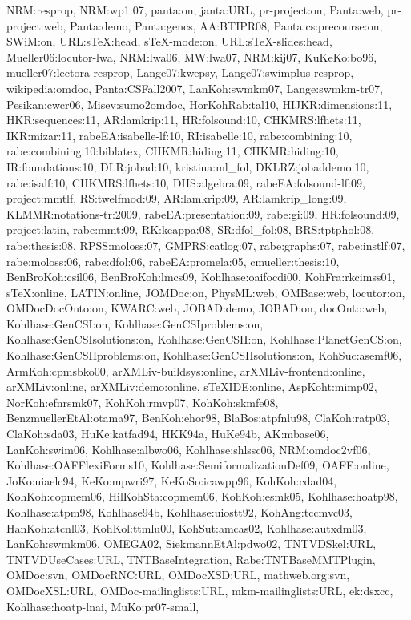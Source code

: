 {NRM:resprop,
NRM:wp1:07,
panta:on,
janta:URL,
pr-project:on,
Panta:web,
pr-project:web,
Panta:demo,
Panta:gencs,
AA:BTIPR08,
Panta:cs:precourse:on,
SWiM:on,
URL:sTeX:head,
sTeX-mode:on,
URL:sTeX-slides:head,
Mueller06:locutor-lwa,
NRM:lwa06,
MW:lwa07,
NRM:kij07,
KuKeKo:bo96,
mueller07:lectora-resprop,
Lange07:kwepsy,
Lange07:swimplus-resprop,
wikipedia:omdoc,
Panta:CSFall2007,
LanKoh:swmkm07,
Lange:swmkm-tr07,
Pesikan:cwcr06,
Misev:sumo2omdoc,
HorKohRab:tal10,
HIJKR:dimensions:11,
HKR:sequences:11,
AR:lamkrip:11,
HR:folsound:10,
CHKMRS:lfhets:11,
IKR:mizar:11,
rabeEA:isabelle-lf:10,
RI:isabelle:10,
rabe:combining:10,
rabe:combining:10:biblatex,
CHKMR:hiding:11, 
CHKMR:hiding:10,
IR:foundations:10,
DLR:jobad:10,
kristina:ml_fol,
DKLRZ:jobaddemo:10,
rabe:isalf:10,
CHKMRS:lfhets:10,
DHS:algebra:09,
rabeEA:folsound-lf:09,
project:mmtlf,
RS:twelfmod:09,
AR:lamkrip:09,
AR:lamkrip_long:09,
KLMMR:notations-tr:2009,
rabeEA:presentation:09,
rabe:gi:09,
HR:folsound:09,
project:latin,
rabe:mmt:09,
RK:keappa:08,
SR:dfol_fol:08,
BRS:tptphol:08,
rabe:thesis:08,
RPSS:moloss:07,
GMPRS:catlog:07,
rabe:graphs:07,
rabe:instlf:07,
rabe:moloss:06,
rabe:dfol:06,
rabeEA:promela:05,
cmueller:thesis:10,
BenBroKoh:csil06,
BenBroKoh:lmcs09,
Kohlhase:oaifocdi00,
KohFra:rkcimss01,
sTeX:online,
LATIN:online,
JOMDoc:on,
PhysML:web,
OMBase:web,
locutor:on,
OMDocDocOnto:on,
KWARC:web,
JOBAD:demo,
JOBAD:on,
docOnto:web,
Kohlhase:GenCSI:on,
Kohlhase:GenCSIproblems:on,
Kohlhase:GenCSIsolutions:on,
Kohlhase:GenCSII:on,
Kohlhase:PlanetGenCS:on,
Kohlhase:GenCSIIproblems:on,
Kohlhase:GenCSIIsolutions:on,
KohSuc:asemf06,
ArmKoh:cpmsbko00,
arXMLiv-buildsys:online,
arXMLiv-frontend:online,
arXMLiv:online,
arXMLiv:demo:online,
sTeXIDE:online,
AspKoht:mimp02,
NorKoh:efnrsmk07,
KohKoh:rmvp07,
KohKoh:skmfe08,
BenzmuellerEtAl:otama97,
BenKoh:ehor98,
BlaBos:atpfnlu98,
ClaKoh:ratp03,
ClaKoh:sda03,
HuKe:katfad94,
HKK94a,
HuKe94b,
AK:mbase06,
LanKoh:swim06,
Kohlhase:albwo06,
Kohlhase:shlssc06,
NRM:omdoc2vf06,
Kohlhase:OAFFlexiForms10,
Kohlhase:SemiformalizationDef09,
OAFF:online,
JoKo:uiaelc94,
KeKo:mpwri97,
KeKoSo:icawpp96,
KohKoh:cdad04,
KohKoh:copmem06,
HilKohSta:copmem06,
KohKoh:esmk05,
Kohlhase:hoatp98,
Kohlhase:atpm98,
Kohlhase94b,
Kohlhase:uiostt92,
KohAng:tccmvc03,
HanKoh:atcnl03,
KohKol:ttmlu00,
KohSut:amcas02,
Kohlhase:autxdm03,
LanKoh:swmkm06,
OMEGA02,
SiekmannEtAl:pdwo02,
TNTVDSkel:URL,
TNTVDUseCases:URL,
TNTBaseIntegration,
Rabe:TNTBaseMMTPlugin,
OMDoc:svn,
OMDocRNC:URL,
OMDocXSD:URL,
mathweb.org:svn,
OMDocXSL:URL,
OMDoc-mailinglists:URL,
mkm-mailinglists:URL,
ek:dsxcc,
Kohlhase:hoatp-lnai,
MuKo:pr07-small,
}
